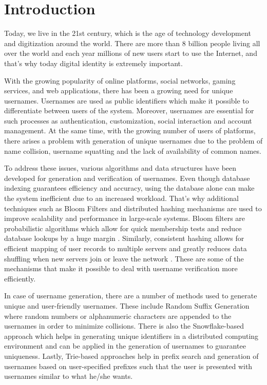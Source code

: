 \documentclass[conference]{IEEEtran}
\begin{document}
\section{Introduction}
Today, we live in the 21st century, which is the age of technology development and digitization around the world. There are more than 8 billion people living all over the world and each year millions of new users start to use the Internet, and that's why today digital identity is extremely important.

With the growing popularity of online platforms, social networks, gaming services, and web applications, there has been a growing need for unique usernames. Usernames are used as public identifiers which make it possible to differentiate between users of the system. Moreover, usernames are essential for such processes as authentication, customization, social interaction and account management. At the same time, with the growing number of users of platforms, there arises a problem with generation of unique usernames due to the problem of name collision, username squatting and the lack of availability of common names.

To address these issues, various algorithms and data structures have been developed for generation and verification of usernames. Even though database indexing guarantees efficiency and accuracy, using the database alone can make the system inefficient due to an increased workload. That's why additional techniques such as Bloom Filters and distributed hashing mechanisms are used to improve scalability and performance in large-scale systems. Bloom filters are probabilistic algorithms which allow for quick membership tests and reduce database lookups by a huge margin \cite{b1,b2}. Similarly, consistent hashing allows for efficient mapping of user records to multiple servers and greatly reduces data shuffling when new servers join or leave the network \cite{b3}. These are some of the mechanisms that make it possible to deal with username verification more efficiently.

In case of username generation, there are a number of methods used to generate unique and user-friendly usernames. These include Random Suffix Generation where random numbers or alphanumeric characters are appended to the usernames in order to minimize collisions. There is also the Snowflake-based approach which helps in generating unique identifiers in a distributed computing environment and can be applied in the generation of usernames to guarantee uniqueness. Lastly, Trie-based approaches help in prefix search and generation of usernames based on user-specified prefixes such that the user is presented with usernames similar to what he/she wants.
\end{document}
